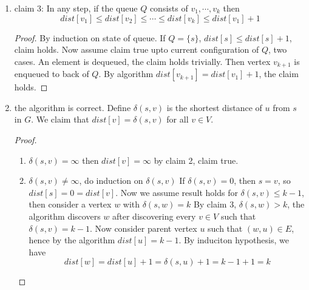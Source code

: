\documentclass[11pt]{article}
\begin{document}
\begin{defn*}
\begin{enumerate}
\begin{enumerate}
\begin{proof}
         By induction on the number $k$ vertices discovered by the algorithm. If $k=1$, $\delta(s,s) = 0 = dist[s]$, holds. If $k > 1$, then assume results holds for $\leq k-1$ Prove it holds for $k$th vertex. Say $v$ is discovered from $u$, then by induction hypothesis $dist[u] = \delta(s,u)$, we have
         \[
          dist[v] = dist[u] + 1 = \delta(s, u) + 1
         \]
         By claim 1
         \[
          dist[v] \geq \delta(s, v)
         \]
       \end{proof}
       \item claim 3: In any step, if the queue $Q$ consists of $v_1, \cdots, v_k$ then
       \[
        dist[v_1] \leq dist[v_2] \leq \cdots \leq dist[v_k] \leq dist[v_1] + 1
       \]
       \begin{proof}
         By induction on state of queue. If $Q = \{ s\}$, $dist[s] \leq dist[s] + 1$, claim holds. Now assume claim true upto current configuration of $Q$, two cases. An element is dequeued, the claim holds trivially. Then vertex $v_{k+1}$ is enqueued to back of $Q$. By algorithm $dist[v_{k+1}] = dist[v_1] + 1$, the claim holds.
       \end{proof}
       \item the algorithm is correct. Define $\delta(s, v)$ is the shortest distance of $u$ from $s$ in $G$. We claim that $dist[v] = \delta(s,v)$ for all $v\in V$.
       \begin{proof}
         $ $\\
         \begin{enumerate}
           \item $\delta(s, v) = \infty$ then $dist[v] = \infty$ by claim 2, claim true.
           \item $\delta(s, v) \neq \infty$, do induction on $\delta(s, v)$ If $\delta(s, v) = 0$, then $s = v$, so $dist[s] = 0 = dist[v]$. Now we assume result holds for $\delta(s, v) \leq k -1$, then consider a vertex $w$ with $\delta(s, w) = k$ By claim 3, $\delta(s, w) > k$, the algorithm discovers $w$ after discovering every $v\in V$ such that $\delta(s, v) = k -1$. Now consider parent vertex $u$ such that $(w, u)\in E$, hence by the algorithm $dist[u] = k - 1$. By induciton hypothesis, we have
           \[
            dist[w] = dist[u] + 1 = \delta(s, u) + 1 = k - 1 + 1 = k
           \]
         \end{enumerate}
       \end{proof}
     \end{enumerate}
  \end{enumerate}
\end{defn*}
\end{document}
